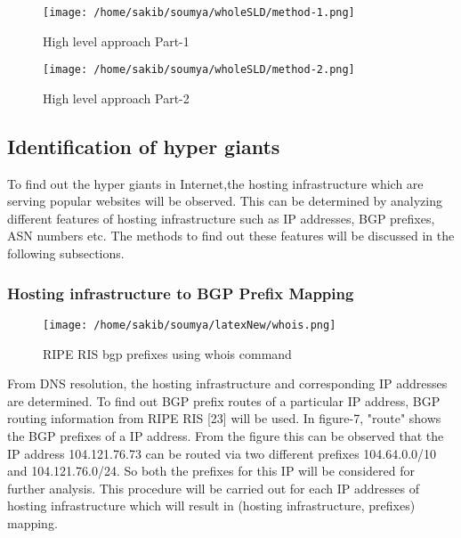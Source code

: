 \begin{figure}[h]
\texttt{[image: /home/sakib/soumya/wholeSLD/method-1.png]}
\centering
\caption{High level approach Part-1}
\end{figure}

\begin{figure}[h]
\texttt{[image: /home/sakib/soumya/wholeSLD/method-2.png]}
\centering
\caption{High level approach Part-2}
\end{figure}

\subsection{Identification of hyper giants}
To find out the hyper giants in Internet,the hosting infrastructure which are serving popular websites will be observed. This can be determined by analyzing different features of hosting infrastructure such as IP addresses, BGP prefixes, ASN numbers etc. The methods to find out these features will be discussed in the following subsections.
\subsubsection{Hosting infrastructure to BGP Prefix Mapping}
\begin{figure}[h]
\texttt{[image: /home/sakib/soumya/latexNew/whois.png]}
\centering
\caption{RIPE RIS bgp prefixes using whois command}
\end{figure}
From DNS resolution, the hosting infrastructure and corresponding IP addresses are determined. To find out BGP prefix routes of a particular IP address, BGP routing information from RIPE RIS [23] will be used. In figure-7, "route" shows the BGP prefixes of a IP address. From the figure this can be observed that the IP address 104.121.76.73 can be routed via two different prefixes 104.64.0.0/10 and 104.121.76.0/24. So both the prefixes for this IP will be considered for further analysis. This procedure will be carried out for each IP addresses of hosting infrastructure which will result in (hosting infrastructure, prefixes) mapping.

